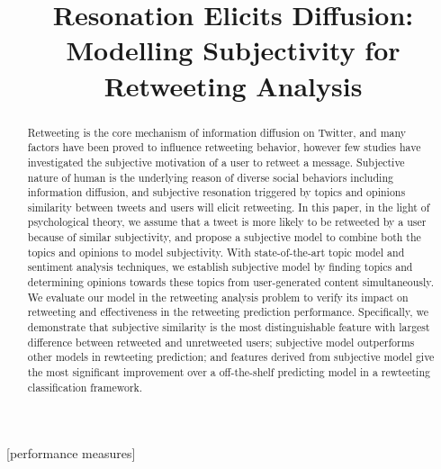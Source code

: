 \documentclass{acm_proc_article-sp}
\newcommand{\mo}[1]{\textcolor{red}{#1}}
\begin{document}
\title{Resonation Elicits Diffusion: Modelling Subjectivity for Retweeting Analysis}

\maketitle
\begin{abstract}
Retweeting is the core mechanism of information diffusion on Twitter, and many factors have been proved to influence retweeting behavior, however few studies have investigated the subjective motivation of a user to retweet a message. 
Subjective nature of human is the underlying reason of diverse social behaviors including information diffusion, and subjective resonation triggered by topics and opinions similarity between tweets and users will elicit retweeting.
In this paper, in the light of psychological theory, we assume that a tweet is more likely to be retweeted by a user because of similar subjectivity, and propose a subjective model to combine both the topics and opinions to model subjectivity. 
With state-of-the-art topic model and sentiment analysis techniques, we establish subjective model by finding topics and determining opinions towards these topics from user-generated content simultaneously.
We evaluate our model in the retweeting analysis problem to verify its impact on retweeting and effectiveness in the retweeting prediction performance. 
Specifically, we demonstrate that subjective similarity is the most distinguishable feature with largest difference between retweeted and unretweeted users;
subjective model outperforms other models in rewteeting prediction; 
and features derived from subjective model give the most significant improvement over a off-the-shelf predicting model in a rewteeting classification framework.
\end{abstract}
[performance measures]
\end{document}
